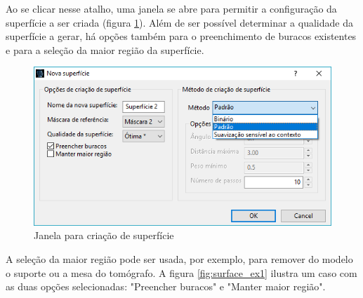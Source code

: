 Ao se clicar nesse atalho, uma janela se abre para permitir a configuração da superfície a
ser criada (figura \ref{fig:create_surface_1}). Além de ser possível determinar a qualidade
da superfície a gerar, há opções também para o preenchimento de buracos existentes e para a
seleção da maior região da superfície.

\begin{figure}[!htb]
\centering
\includegraphics[scale=0.5]{../user_guide_figures/invesalius_screen/surface_config_window_pt.png}
\caption{Janela para criação de superfície}
\label{fig:create_surface_1}
\end{figure}


A seleção da maior região pode ser usada, por exemplo, para remover do modelo o suporte ou a
mesa do tomógrafo. A figura \ref{fig:surface_ex1} ilustra um caso com as duas opções
selecionadas: "Preencher buracos" e "Manter maior região".

\newpage

